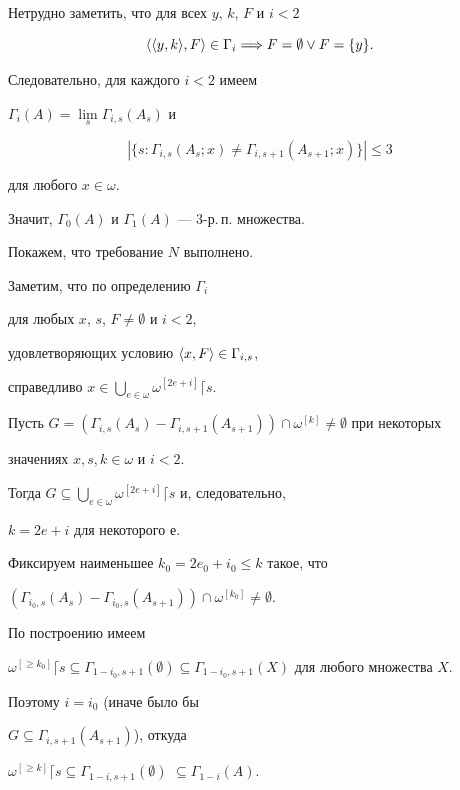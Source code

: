 \begin{pf}


Нетрудно заметить, что для всех $y$, $k$, $F$ и $i<2$


$$


\aq{\aq{y,k}, F}\in\Gamma_i\Longrightarrow F=\emptyset \vee F=\{y\}.


$$


Следовательно, для каждого $i<2$ имеем


$\Gamma_i(A)=\lim\limits_s\Gamma_{i,s}(A_s)$ и


$$


|\{s:\Gamma_{i,s}(A_s;x)\ne\Gamma_{i,s+1}(A_{s+1};x)\}|\le 3


$$ 


для любого $x\in\omega$.


Значит, $\Gamma_0(A)$ и $\Gamma_1(A)$ --- $3$-р.\,п. множества.





Покажем, что требование $N$ выполнено. 


Заметим, что по определению $\Gamma_i$


для любых $x$, $s$, $F\ne\emptyset$ и $i<2$,


удовлетворяющих условию ${\langle x,F \rangle}\in\Gamma_{i,s}$,


справедливо $x\in\bigcup\limits_{e\in\omega}\omega^{[2e+i]}\lceil s$.





Пусть $G=(\Gamma_{i,s}(A_s)-\Gamma_{i,s+1}(A_{s+1}))\cap


\omega^{[k]}\ne\emptyset$ при некоторых


значениях $x,s,k\in\omega$ и $i<2$. 


Тогда $G\subseteq\bigcup_{e\in\omega}\omega^{[2e+i]}\lceil s$ и, следовательно,


$k=2e+i$ для некоторого $е$.


Фиксируем наименьшее $k_0=2e_0+i_0\le k$ такое, что


$(\Gamma_{i_0,s}(A_s)-\Gamma_{i_0,s}(A_{s+1}))\cap\omega^{[k_0]}\ne\emptyset$.


По построению имеем


$\omega^{[\ge k_0]}\lceil s\subseteq\Gamma_{1-i_0,s+1}(\emptyset)\subseteq


\Gamma_{1-i_0,s+1}(X)$ для любого множества $X$.


Поэтому $i=i_0$ (иначе было бы


$G\subseteq\Gamma_{i,s+1}(A_{s+1})$), откуда 


$\omega^{[\ge k]}\lceil s\subseteq\Gamma_{1-i,s+1}


(\emptyset)$ $\subseteq\Gamma_{1-i}(A)$.


\end{pf}





